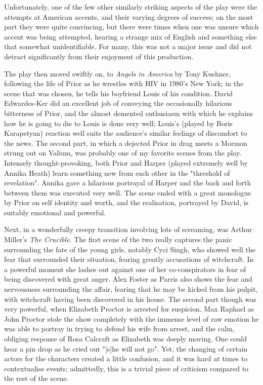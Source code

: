 Unfortunately, one of the few other similarly striking aspects of the
play were the attempts at American accents, and their varying degrees of
success; on the most part they were quite convincing, but there were
times when one was unsure which accent was being attempted, hearing a
strange mix of English and something else that somewhat unidentifiable.
For many, this was not a major issue and did not detract significantly
from their enjoyment of this production.

The play then moved swiftly on, to \textit{Angels in America} by Tony
Kushner, following the life of Prior as he wrestles with HIV in 1980's
New York; in the scene that was chosen, he tells his boyfriend Louis of
his condition. David Edwardes-Ker did an excellent job of conveying the
occasionally hilarious bitterness of Prior, and the almost demented
enthusiasm with which he explains how he is going to die to Louis is
done very well; Louis's (played by Boris Karapetyan) reaction well suits
the audience's similar feelings of discomfort to the news. The second
part, in which a dejected Prior in drag meets a Mormon strung out on
Valium, was probably one of my favorite scenes from the play. Intensely
thought-provoking, both Prior and Harper (played extremely well by
Annika Heath) learn something new from each other in the "threshold of
revelation". Annika gave a hilarious portrayal of Harper and the back
and forth between them was executed very well. The scene ended with a
great monologue by Prior on self identity and worth, and the
realisation, portrayed by David, is suitably emotional and powerful.

Next, in a wonderfully creepy transition involving lots of screaming,
was Arthur Miller's \textit{The Crucible}. The first scene of the two
really captures the panic surrounding the fate of the young girls,
notably Cyci Singh, who showed well the fear that surrounded their
situation, fearing greatly accusations of witchcraft. In a powerful
moment she lashes out against one of her co-conspirators in fear of
being discovered with great anger. Alex Foster as Parris also shows the
fear and nervousness surrounding the affair, fearing that he may be
kicked from his pulpit, with witchcraft having been discovered in his
house. The second part though was very powerful, when Elizabeth Proctor
is arrested for suspicion. Max Raphael as John Proctor stole the show
completely with the immense level of raw emotion he was able to portray
in trying to defend his wife from arrest, and the calm, obliging
response of Rosa Calcraft as Elizabeth was deeply moving. One could hear
a pin drop as he cried out "{[}s{]}he will not go". Yet, the changing of
certain actors for the characters created a little confusion, and it was
hard at times to contextualise events; admittedly, this is a trivial
piece of criticism compared to the rest of the scene.

